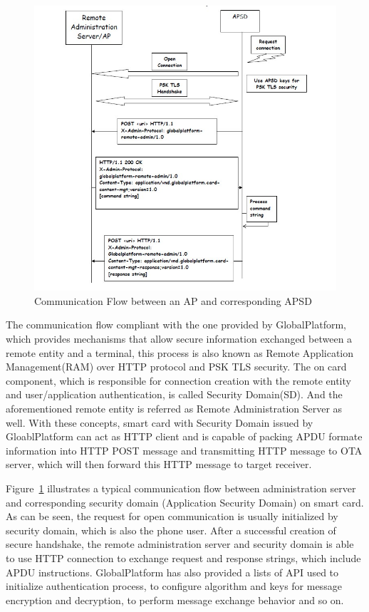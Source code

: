 \documentclass[]{llncs}
\begin{document}
\begin{figure}
	\centering
	\includegraphics[width=1.2\textwidth]{apsd.jpg}
		\caption[ ]{Communication Flow between an AP and corresponding APSD\cite{ramGP}}
	\label{fig:apsd}
\end{figure}
The communication flow compliant with the one provided by GlobalPlatform, which provides mechanisms that allow secure information exchanged between a remote entity and a terminal, this process is also known as Remote Application Management(RAM) over HTTP protocol and PSK TLS security. The on card component, which is responsible for connection creation with the remote entity and user/application authentication, is called Security Domain(SD). And the aforementioned remote entity  is  referred as Remote Administration Server as well. With these concepts, smart card with Security Domain issued  by GloablPlatform can act as HTTP client and is capable of packing APDU formate information into HTTP POST message and transmitting HTTP message to OTA server, which will then forward this HTTP message to target receiver.\cite{ramGP}
 
Figure~\ref{fig:apsd} illustrates a typical communication flow between administration server and corresponding security domain (Application Security Domain) on smart card. As can be seen, the request for open communication is usually initialized by security domain, which is also the phone user. After a successful creation of secure handshake, the remote administration server and security domain is able to use HTTP connection to exchange request and response strings, which include APDU instructions. GlobalPlatform has also provided  a lists of API used to initialize authentication process, to configure algorithm and keys for message  encryption and decryption, to perform message exchange  behavior and so on.
\end{document}
